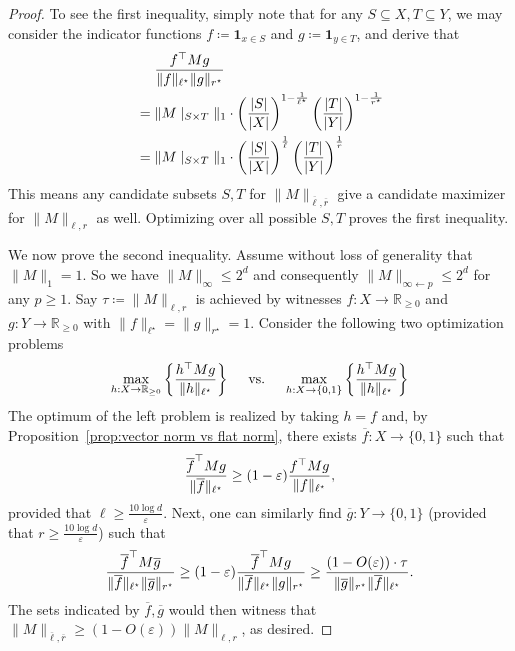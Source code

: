 \documentclass[10pt,a4paper]{amsart}
\newcommand{\eps}{\varepsilon}
\begin{document}
\begin{proof}
    To see the first inequality, simply note that for any $S\subseteq X,T\subseteq Y$, we may consider the indicator functions $f\coloneqq \mathbf{1}_{x\in S}$ and $g\coloneqq \mathbf{1}_{y\in T}$, and derive that
    \begin{align}
        &~~~~\frac{f^\top M g}{\|f\|_{\ell^\star}\|g\|_{r^\star}} \notag \\
        &= \| M\mid_{S\times T}\|_1\cdot \left(\frac{|S|}{|X|}\right)^{1-\frac{1}{\ell^\star}} \left( \frac{|T|}{|Y|} \right)^{1-\frac{1}{r^\star}} \notag \\
        &=  \| M\mid_{S\times T}\|_1\cdot \left(\frac{|S|}{|X|}\right)^{\frac{1}{\ell}} \left( \frac{|T|}{|Y|} \right)^{\frac{1}{r}}  \notag
    \end{align}
    This means any candidate subsets $S,T$ for $\|M\|_{\overline{\ell},\overline{r}}$ give a candidate maximizer for $\|M\|_{\ell, r}$ as well. Optimizing over all possible $S,T$ proves the first inequality.

    We now prove the second inequality. Assume without loss of generality that $\|M\|_1 = 1$. So we have $\|M\|_{\infty}\le 2^d$ and consequently $\|M\|_{\infty\gets p}\le 2^d$ for any $p\ge 1$. Say $\tau \coloneqq \|M\|_{\ell, r}$ is achieved by witnesses $f:X\to \mathbb{R}_{\ge 0}$ and $g:Y\to \mathbb{R}_{\ge 0}$ with $\|f\|_{\ell^\star} = \|g\|_{r^\star} = 1$. Consider the following two optimization problems
    \begin{align}
        \max_{h:X\to \mathbb{R}_{\ge 0}}\left\{ \frac{h^\top M g}{\|h\|_{\ell^\star}} \right\} \text{~~~~vs.~~~~} \max_{h:X\to \{0,1\}}\left\{ \frac{h^\top M g}{\|h\|_{\ell^\star} } \right\}\notag 
    \end{align}
    The optimum of the left problem is realized by taking $h=f$ and, by Proposition~\ref{prop:vector norm vs flat norm}, there exists $\overline{f}:X\to \{0, 1\}$ such that
    \begin{align}
        \frac{\overline{f}^\top M g}{\|\overline{f}\|_{\ell^\star} } \ge (1-\eps)  \frac{f^\top M g}{\|f\|_{\ell^\star} }, \notag
    \end{align}
    provided that $\ell \ge \frac{10 \log d}{\eps}$. Next, one can similarly find $\overline{g}:Y\to \{0,1\}$ (provided that $r\ge \frac{10 \log d}{\eps}$) such that
    \begin{align}
        \frac{\overline{f}^\top M \overline{g}}{\|\overline{f}\|_{\ell^\star} \| \overline{g}\|_{r^\star} } \ge (1-\eps) \frac{\overline{f}^\top M g}{\|\overline{f}\|_{\ell^\star} \| g\|_{r^\star} } \ge \frac{(1-O(\eps))\cdot \tau}{\|\overline{g}\|_{r^\star} \|\overline{f}\|_{\ell^\star}} . \notag
    \end{align}
    The sets indicated by $\overline{f},\overline{g}$ would then witness that $\|M\|_{\overline{\ell},\overline{r}} \ge (1-O(\eps)) \|M\|_{\ell, r}$, as desired.
\end{proof}
\end{document}

